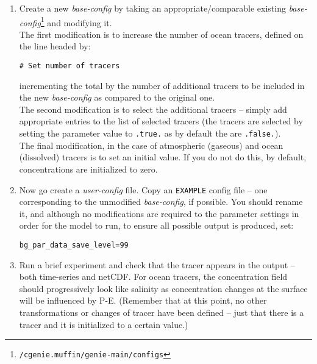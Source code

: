 \documentclass[10pt,twoside]{article}
\begin{document}
\begin{enumerate}
\item 
Create a new \textit{base-config} by taking an appropriate/comparable existing \textit{base-config}\footnote{\texttt{/cgenie.muffin/genie-main/configs}} and modifying it.
\\The first modification is to increase the number of ocean tracers, defined on the line headed by:
\vspace{-10pt}\begin{verbatim}
# Set number of tracers
\end{verbatim}\vspace{-10pt}
incrementing the total by the number of additional tracers to be included in the new \textit{base-config} as compared to the original one.
\\The second modification is to select the additional tracers -- simply add appropriate entries to the list of selected tracers (the tracers are selected by setting the parameter value to \texttt{.true.} as by default the are \texttt{.false.}).
\\The final modification, in the case of atmospheric (gaseous) and  ocean (dissolved) tracers is to set an initial value. If you do not do this, by default, concentrations are initialized to zero.
\item
Now go create a \textit{user-config} file. Copy an \texttt{EXAMPLE} config file -- one corresponding to the unmodified \textit{base-config}, if possible. You should rename it, and although no modifications are required to the parameter settings in order for the model to run, to ensure all possible output is produced, set:
\vspace{-10pt}\begin{verbatim}
bg_par_data_save_level=99
\end{verbatim}\vspace{-10pt}
\item
Run a brief experiment and check that the tracer appears in the output -- both time-series and netCDF. For ocean tracers, the concentration field should progressively look like salinity as concentration changes at the surface will be influenced by P-E. (Remember that at this point, no other transformations or changes of tracer have been defined -- just that there is a tracer and it is initialized to a certain value.)
\end{enumerate}

\end{document}

